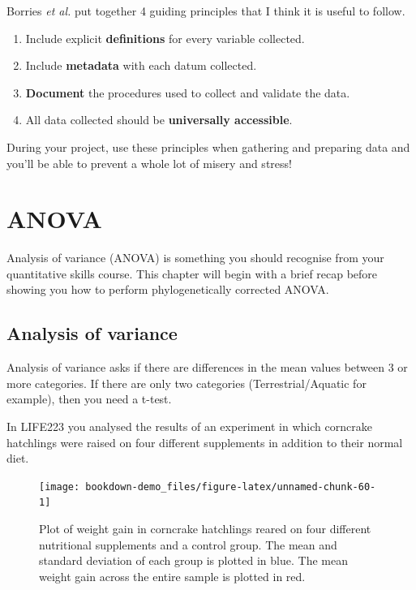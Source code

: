 \documentclass[
]{book}
\providecommand{\tightlist}{%
  \setlength{\itemsep}{0pt}\setlength{\parskip}{0pt}}
\begin{document}
Borries \emph{et al.} \citeyearpar{Borries16} put together 4 guiding principles that I think it is useful to follow.

\begin{enumerate}
\def\labelenumi{\arabic{enumi}.}
\tightlist
\item
  Include explicit \textbf{definitions} for every variable collected.
\item
  Include \textbf{metadata} with each datum collected.
\item
  \textbf{Document} the procedures used to collect and validate the data.
\item
  All data collected should be \textbf{universally accessible}.
\end{enumerate}

During your project, use these principles when gathering and preparing data and you'll be able to prevent a whole lot of misery and stress!

\hypertarget{anova}{%
\chapter{ANOVA}\label{anova}}

Analysis of variance (ANOVA) is something you should recognise from your quantitative skills course. This chapter will begin with a brief recap before showing you how to perform phylogenetically corrected ANOVA.

\hypertarget{analysis-of-variance}{%
\section{Analysis of variance}\label{analysis-of-variance}}

Analysis of variance asks if there are differences in the mean values between 3 or more categories. If there are only two categories (Terrestrial/Aquatic for example), then you need a t-test.

In LIFE223 you analysed the results of an experiment in which corncrake hatchlings were raised on four different supplements in addition to their normal diet.

\begin{figure}[H]

{\centering \texttt{[image: bookdown-demo\_files/figure-latex/unnamed-chunk-60-1]} 

}

\caption{Plot of weight gain in corncrake hatchlings reared on four different nutritional supplements and a control group. The mean and standard deviation of each group is plotted in blue. The mean weight gain across the entire sample is plotted in red.}\label{fig:unnamed-chunk-60}
\end{figure}
\end{document}
